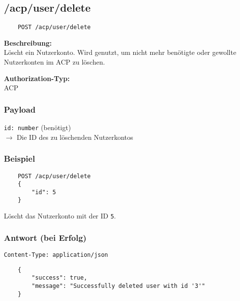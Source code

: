 \subsection{/acp/user/delete}

\begin{lstlisting}
    POST /acp/user/delete
\end{lstlisting}

\textbf{Beschreibung:} \\
Löscht ein Nutzerkonto. Wird genutzt, um nicht mehr benötigte oder gewollte Nutzerkonten im ACP zu löschen.

\textbf{Authorization-Typ:} \\
ACP

\subsubsection{Payload}

\lstinline{id: number} (benötigt) \\
$\rightarrow$ Die ID des zu löschenden Nutzerkontos

\subsubsection{Beispiel}

\begin{lstlisting}
    POST /acp/user/delete
    {
        "id": 5
    }
\end{lstlisting}

Löscht das Nutzerkonto mit der ID \lstinline{5}.

\subsubsection{Antwort (bei Erfolg)}

\lstinline{Content-Type: application/json}
\begin{lstlisting}
    {
        "success": true, 
        "message": "Successfully deleted user with id '3'"
    }
\end{lstlisting}